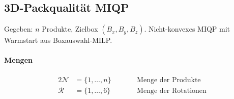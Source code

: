 \documentclass[10pt]{article}
\newcommand{\NN}{\mathcal{N}}
\newcommand{\R}{\mathcal{R}}
\begin{document}


\subsection{3D-Packqualit\"at MIQP}
\label{sec:s2}

Gegeben: $n$ Produkte, Zielbox $(B_x, B_y, B_z)$.
Nicht-konvexes MIQP mit Warmstart aus Boxauswahl-MILP.

\paragraph{Mengen}
\begin{alignat*}{2}
\NN &= \{1, \dots, n\}
  &\qquad& \text{Menge der Produkte} \\
\R &= \{1, \dots, 6\}
  && \text{Menge der Rotationen}
\end{alignat*}
\end{document}
